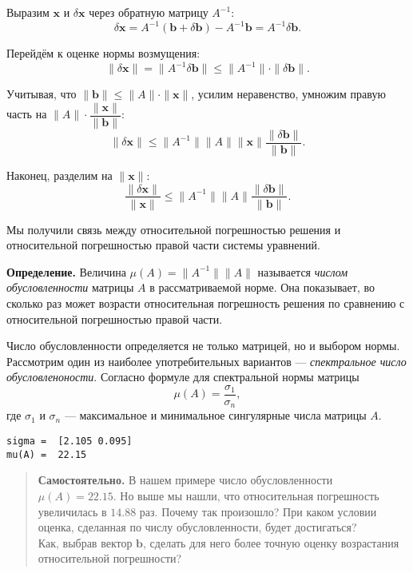 \documentclass[11pt,a4paper]{article}
\begin{document}
Выразим \(\mathbf{x}\) и \(\delta\mathbf{x}\) через обратную матрицу
\(A^{-1}\):
\[ \delta \mathbf{x} = A^{-1}(\mathbf{b} + \delta\mathbf{b}) - A^{-1}\mathbf{b} = A^{-1}\delta\mathbf{b}. \]

Перейдём к оценке нормы возмущения:
\[ \|\delta \mathbf{x}\| = \|A^{-1} \delta \mathbf{b}\| \le \|A^{-1}\| \cdot \|\delta \mathbf{b}\|. \]

Учитывая, что \(\|\mathbf{b}\| \le \|A\| \cdot \|\mathbf{x}\|\), усилим
неравенство, умножим правую часть на
\(\|A\| \cdot \dfrac{\|\mathbf{x}\|}{\|\mathbf{b}\|}\):
\[ \|\delta \mathbf{x}\| \le \|A^{-1}\| \|A\| \|\mathbf{x}\| \frac{\|\delta \mathbf{b}\|}{\|\mathbf{b}\|}. \]

Наконец, разделим на \(\|\mathbf{x}\|\):
\[ \frac{\|\delta \mathbf{x}\|}{\|\mathbf{x}\|} \le \|A^{-1}\| \|A\| \frac{\|\delta \mathbf{b}\|}{\|\mathbf{b}\|}. \]

Мы получили связь между относительной погрешностью решения и
относительной погрешностью правой части системы уравнений.

    \textbf{Определение.} Величина \(\mu(A) = \|A^{-1}\| \|A\|\) называется
\emph{числом обусловленности} матрицы \(A\) в рассматриваемой норме. Она
показывает, во сколько раз может возрасти относительная погрешность
решения по сравнению с относительной погрешностью правой части.

Число обусловленности определяется не только матрицей, но и выбором
нормы. Рассмотрим один из наиболее употребительных вариантов ---
\emph{спектральное число обусловленоности}. Согласно формуле для
спектральной нормы матрицы \[ \mu(A) = \dfrac{\sigma_1}{\sigma_n}, \]
где \(\sigma_1\) и \(\sigma_n\) --- максимальное и минимальное
сингулярные числа матрицы \(A\).


    \begin{Verbatim}[commandchars=\\\{\}]
sigma =  [2.105 0.095]
mu(A) =  22.15
    \end{Verbatim}

    \begin{quote}
\textbf{Самостоятельно.} В нашем примере число обусловленности
\(\mu(A)=22.15\). Но выше мы нашли, что относительная погрешность
увеличилась в \(14.88\) раз. Почему так произошло? При каком условии
оценка, сделанная по числу обусловленности, будет достигаться?\\
Как, выбрав вектор \(\mathbf{b}\), сделать для него более точную оценку
возрастания относительной погрешности?
\end{quote}
\end{document}
